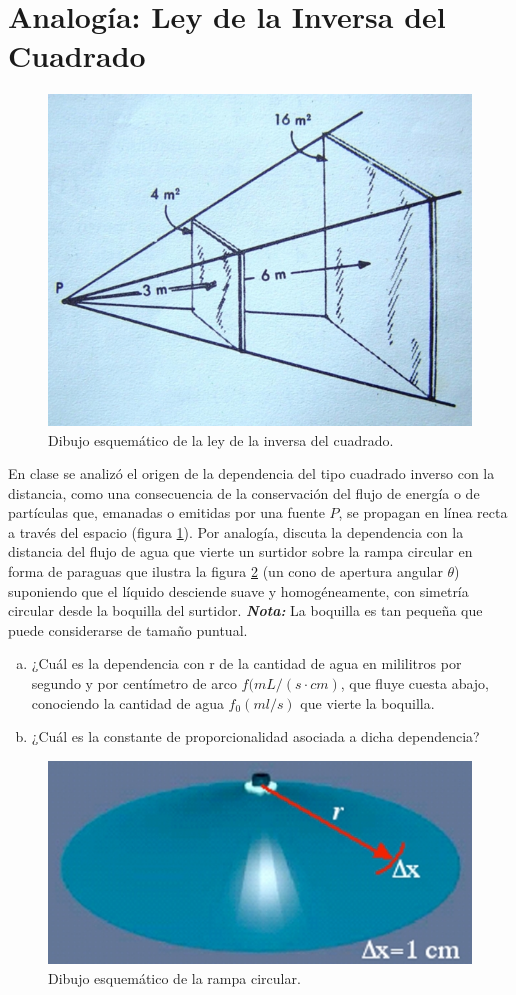\documentclass{replab}
\begin{document}
	\section{Analogía: Ley de la Inversa del Cuadrado}

	\begin{figure}[htbp]
		\centering
		\includegraphics[width=.5\columnwidth]{imagenes/r-2.jpeg}
		\caption{Dibujo esquemático de la ley de la inversa del cuadrado.}
		\label{fig:r-2}
	\end{figure}

	En clase se analizó el origen de la dependencia del tipo cuadrado inverso con la distancia, como una consecuencia de la conservación del flujo de energía o de partículas que, emanadas o emitidas por una fuente $P$, se propagan en línea recta a través del espacio (figura \ref{fig:r-2}). Por analogía, discuta la dependencia con la distancia del flujo de agua que vierte un surtidor sobre la rampa circular en forma de paraguas que ilustra la figura \ref{fig:r-1} (un cono de apertura angular $\theta$) suponiendo que el líquido desciende suave y homogéneamente, con simetría circular desde la boquilla del surtidor. \textit{\textbf{Nota:}} La boquilla es tan pequeña que puede considerarse de tamaño puntual. 

	\begin{enumerate}[a)]
		\item ¿Cuál es la dependencia con r de la cantidad de agua en mililitros por segundo y por centímetro de arco $f(mL/(s\cdot cm)$, que fluye cuesta abajo, conociendo la cantidad de agua $f_0(ml/s)$ que vierte la boquilla.
		\item ¿Cuál es la constante de proporcionalidad asociada a 
		dicha dependencia?
	\end{enumerate}

	\begin{figure}[htbp]
		\centering
		\includegraphics[width=.5\columnwidth]{imagenes/r-1.jpeg}
		\caption{Dibujo esquemático de la rampa circular.}
		\label{fig:r-1}
	\end{figure}

	\printbibliography[heading=bibintoc]
	
\end{document}
